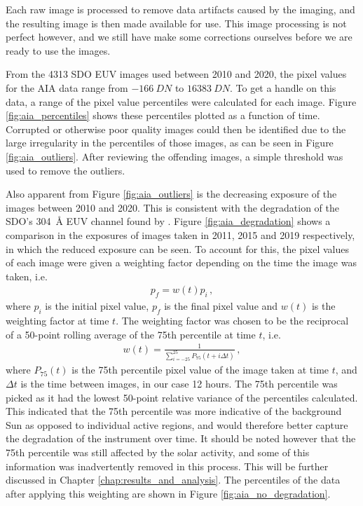 \documentclass[11pt,a4paper,onecolumn]{report}
\begin{document}
Each raw image is processed to remove data artifacts caused by the imaging,
and the resulting image is then made available for use. This image processing is
not perfect however, and we still have make some corrections ourselves before we
are ready to use the images.

From the 4313 SDO EUV images used between 2010 and 2020, the pixel values for
the AIA data range from \(\SI[]{-166}[]{DN}\) to \(\SI[]{16383}[]{DN}\). To get
a handle on this data, a range of the pixel value percentiles were calculated
for each image. Figure \ref{fig:aia_percentiles} shows these percentiles plotted
as a function of time. Corrupted or otherwise poor quality images could then be
identified due to the large irregularity in the percentiles of those images, as
can be seen in Figure \ref{fig:aia_outliers}. After reviewing the offending
images, a simple threshold was used to remove the outliers.

Also apparent from Figure \ref{fig:aia_outliers} is the decreasing exposure of
the images between 2010 and 2020. This is consistent with the degradation of the
SDO's \SI{304}{\angstrom} EUV channel found by \citet{boerner_photometric_2014}.
Figure \ref{fig:aia_degradation} shows a comparison in the exposures of images
taken in 2011, 2015 and 2019 respectively, in which the reduced exposure can be
seen. To account for this, the pixel values of each image were given a weighting
factor depending on the time the image was taken, i.e.
\begin{align}
  p_f = w(t) p_i \, ,
\end{align}
where $p_i$ is the initial pixel value, $p_f$ is the final pixel value and $w(t)$
is the weighting factor at time $t$. The weighting factor was chosen to be the 
reciprocal of a 50-point rolling average of the 75th
percentile at time $t$, i.e.
\begin{align}
  w(t) = \frac{1}{\sum\limits_{i=-25}^{25}P_{75}(t + i \Delta t)} \, ,
\end{align}
where $P_{75}(t)$ is the 75th percentile pixel value of the image taken at time
$t$, and $\Delta t$ is the time between images, in our case 12 hours. The 75th
percentile was picked as it had the lowest 50-point relative variance of the
percentiles calculated. This indicated that the 75th percentile was more
indicative of the background Sun as opposed to individual active regions, and
would therefore better capture the degradation of the instrument over time. It
should be noted however that the 75th percentile was still affected by the solar
activity, and some of this information was inadvertently removed in this
process. This will be further discussed in Chapter
\ref{chap:results_and_analysis}. The percentiles of the data after applying this
weighting are shown in Figure \ref{fig:aia_no_degradation}. \\
\end{document}
